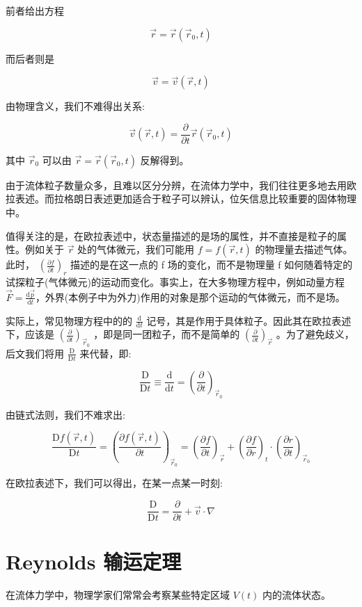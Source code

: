 \documentclass[fontset=windows]{article}
\begin{document}
前者给出方程

$$\vec{r} = \vec{r}(\vec{r}_0,t)$$

而后者则是

$$\vec{v} = \vec{v}(\vec{r},t)$$

由物理含义，我们不难得出关系:

$$\vec{v}(\vec{r},t) = \frac{\partial}{\partial t} \vec{r}(\vec{r}_0,t) $$

其中 $\vec{r}_0$ 可以由 $ \vec{r} = \vec{r}(\vec{r}_0,t) $ 反解得到。

由于流体粒子数量众多，且难以区分分辨，在流体力学中，我们往往更多地去用欧拉表述。而拉格朗日表述更加适合于粒子可以辨认，位矢信息比较重要的固体物理中。

值得关注的是，在欧拉表述中，状态量描述的是场的属性，并不直接是粒子的属性。例如关于 $\vec{r}$ 处的气体微元，我们可能用 $f = f(\vec{r},t)$ 的物理量去描述气体。此时， $(\frac{\partial f}{\partial t})_r$ 描述的是在这一点的 f 场的变化，而不是物理量 f 如何随着特定的试探粒子(气体微元)的运动而变化。事实上，在大多物理方程中，例如动量方程 $\vec{F} = \frac{\mathrm{d}\vec{p}}{\mathrm{d}t}$，外界(本例子中为外力)作用的对象是那个运动的气体微元，而不是场。

实际上，常见物理方程中的的 $\frac{\mathrm{d}}{\mathrm{d}t}$ 记号，其是作用于具体粒子。因此其在欧拉表述下，应该是 $(\frac{\partial}{\partial t})_{\vec{r}_0}$ ，即是同一团粒子，而不是简单的 $(\frac{\partial}{\partial t})_{\vec{r}}$ 。为了避免歧义，后文我们将用 $\frac{\mathrm{D}}{\mathrm{D}t}$ 来代替，即:

$$
\frac{\mathrm{D}}{\mathrm{D}t} 
\equiv \frac{\mathrm{d}}{\mathrm{d}t} 
= (\frac{\partial}{\partial t})_{\vec{r}_0}
$$

由链式法则，我们不难求出:

$$
\frac{\mathrm{D}f(\vec{r},t)}{\mathrm{D}t}
= (\frac{\partial f(\vec{r},t)}{\partial t})_{\vec{r}_0}
= (\frac{\partial f}{\partial t})_{\vec{r}}
+ (\frac{\partial f}{\partial r})_t \cdot (\frac{\partial r}{\partial t})_{\vec{r}_0}
$$

在欧拉表述下，我们可以得出，在某一点某一时刻:

$$
\frac{\mathrm{D}}{\mathrm{D}t}
= \frac{\partial}{\partial t} + \vec{v} \cdot \nabla
$$


\section{Reynolds 输运定理}

在流体力学中，物理学家们常常会考察某些特定区域 $ V(t) $ 内的流体状态。
\end{document}
